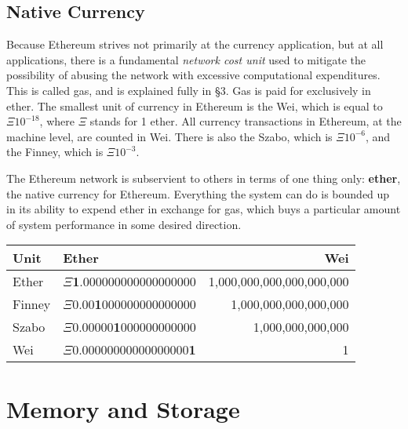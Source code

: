 \documentclass[10pt,letterpaper,leqno,bibliography=totoc]{scrartcl}
\newenvironment{alphafootnotes}
{\par\edef\savedfootnotenumber{\number\value{footnote}}
\renewcommand{\thefootnote}{\alph{footnote}}
\setcounter{footnote}{0}}
{\par\setcounter{footnote}{\savedfootnotenumber}}
\begin{document}
\begin{alphafootnotes}
\begin{multicols*}{2}
\begin{justify}
	 	\subsection{Native Currency}
		Because Ethereum strives not primarily at the currency application, but at all applications, there is a fundamental \textsl{network cost unit} used to mitigate the possibility of abusing the network with excessive computational expenditures. This is called gas, and is explained fully in \S3. Gas is paid for exclusively in ether. The smallest unit of currency in Ethereum is the Wei, which is equal to $\Xi10^{-18}$, where $\Xi$ stands for 1 ether. All currency transactions in Ethereum, at the machine level, are counted in Wei. There is also the Szabo, which is $\Xi10^{-6}$,  and the Finney, which is $\Xi10^{-3}$.
		
		The Ethereum network is subservient to others in terms of one thing only: \textbf{ether}, the native currency for Ethereum. Everything the system can do is bounded up in its ability to expend ether in exchange for gas, which buys a particular amount of system performance in some desired direction. 
		
	\end{justify}
\raggedright
		\begin{tabular}{llr}
			\toprule
			\textbf{Unit} & \textbf{Ether} & \textbf{Wei} \\
			\midrule
			\scriptsize{Ether} & \scriptsize{$\Xi$\textbf{1}.000000000000000000} & \scriptsize{1,000,000,000,000,000,000} \\
			\scriptsize{Finney} & \scriptsize{$\Xi$0.00\textbf{1}000000000000000} & \scriptsize{1,000,000,000,000,000} \\
			\scriptsize{Szabo} & \scriptsize{$\Xi$0.00000\textbf{1}000000000000} & \scriptsize{1,000,000,000,000} \\
			\scriptsize{Wei} & \scriptsize{$\Xi$0.00000000000000000\textbf{1}} & \scriptsize{1} \\
			\bottomrule
		\end{tabular}
\justify
		\section{Memory and Storage}
				
				

\end{multicols*}
\end{alphafootnotes}
\end{document}
